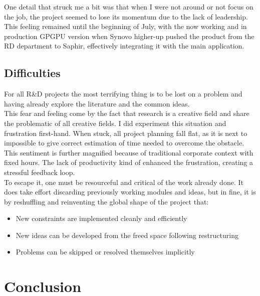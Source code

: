 \documentclass[12pt]{memoir}
\begin{document}
\bigskip
One detail that struck me a bit was that when I were not around or not focus on the job,
the project seemed to lose its momentum due to the lack of leadership. This feeling
remained until the beginning of July, with the now working and in production GPGPU
version when Synovo higher-up pushed the product from the RD department to Saphir,
effectively integrating it with the main application.


\subsection{Difficulties}
For all R\&D projects the most terrifying thing is to be lost on a problem and
having already explore the literature and the common ideas.\\
This fear and feeling come by the fact that research is a creative field and share the
problematic of all creative fields. I did experiment this situation and frustration first-hand.
When stuck, all project planning fall flat, as it is next to impossible to give correct estimation
of time needed to overcome the obstacle. This sentiment is further magnified because of traditional corporate
context with fixed hours. The lack of productivity kind of enhanced the frustration,
creating a stressful feedback loop.\\
To escape it, one must be resourceful and critical of the work already done. It does take effort discarding previously
working modules and ideas, but in fine, it is by reshuffling and reinventing the global shape of the project that:
\begin{itemize}
  \item New constraints are implemented cleanly and efficiently
  \item New ideas can be developed from the freed space following restructuring
  \item Problems can be skipped or resolved themselves implicitly
\end{itemize}
    

\newpage

\newpage

\section{Conclusion}
\end{document}
